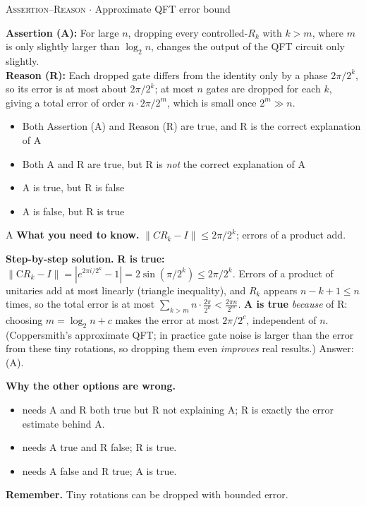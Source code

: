 \documentclass[11pt,a4paper]{article}
\newcommand{\optlabel}[1]{\textbf{(#1)}}
\newcommand{\correctlabel}[1]{\textcolor{okgreen}{\textbf{(#1)}\,\ding{51}}}
\newenvironment{qitem}[1]{\begin{list}{}{\setlength{\leftmargin}{3.3em}\setlength{\labelwidth}{3.1em}%
  \setlength{\labelsep}{0.2em}\setlength{\topsep}{3pt}\setlength{\parsep}{3pt}}\item[\textbf{Q.#1}\hfill]}{\end{list}}
\newcommand{\qsep}{\par\vspace{2pt}{\color{black!15}\hrule}\vspace{4pt}}
\newcommand{\qmeta}[2]{{\footnotesize\color{black!60}\textsc{#1} \;$\cdot$\; #2}\par}
\begin{document}
\begin{qitem}{77}
\qmeta{Assertion--Reason}{Approximate QFT error bound}
\textbf{Assertion (A):} For large $n$, dropping every controlled-$R_k$ with $k > m$, where $m$ is only slightly larger than
$\log_2 n$, changes the output of the QFT circuit only slightly.\\[1mm]
\textbf{Reason (R):} Each dropped gate differs from the identity only by a phase $2\pi/2^{k}$, so its error is at most about
$2\pi/2^{k}$; at most $n$ gates are dropped for each $k$, giving a total error of order $n\cdot 2\pi/2^{m}$, which is small once
$2^m \gg n$.
\begin{itemize}[leftmargin=2.6em, labelsep=0.4em, itemsep=2pt, topsep=3pt]
\item[\correctlabel{A}] Both Assertion (A) and Reason (R) are true, and R is the correct explanation of A
\item[\optlabel{B}] Both A and R are true, but R is \emph{not} the correct explanation of A
\item[\optlabel{C}] A is true, but R is false
\item[\optlabel{D}] A is false, but R is true
\end{itemize}
\end{qitem}
\begin{solbox}{A}
\textbf{\color{brand}What you need to know.} $\|CR_k - I\| \le 2\pi/2^k$; errors of a product add.

\textbf{\color{brand}Step-by-step solution.} \textbf{R is true:} $\|\mathrm{C}R_k - I\| = |e^{2\pi i/2^k} - 1| = 2\sin(\pi/2^k) \le 2\pi/2^k$. Errors of a product of unitaries add
at most linearly (triangle inequality), and $R_k$ appears $n - k + 1 \le n$ times, so the total error is at most
$\sum_{k > m} n\cdot\frac{2\pi}{2^k} < \frac{2\pi n}{2^{m}}$. \textbf{A is true} \emph{because} of R: choosing $m = \log_2 n + c$ makes the error
at most $2\pi/2^{c}$, independent of $n$. (Coppersmith's approximate QFT; in practice gate noise is larger than the
error from these tiny rotations, so dropping them even \emph{improves} real results.) Answer: (A).

\textbf{\color{brand}Why the other options are wrong.}
\begin{itemize}[leftmargin=2.4em, itemsep=1pt, topsep=2pt]
\item[\textbf{(B)}] needs A and R both true but R not explaining A; R is exactly the error estimate behind A.
\item[\textbf{(C)}] needs A true and R false; R is true.
\item[\textbf{(D)}] needs A false and R true; A is true.
\end{itemize}
\textbf{\color{brand}Remember.} Tiny rotations can be dropped with bounded error.
\end{solbox}
\qsep
\end{document}
